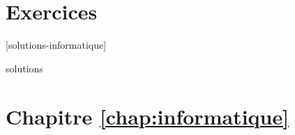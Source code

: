

\section{Exercices}
\label{operateurs:exercices}

[solutions-informatique]

\begin{Filesave}{solutions}
\section*{Chapitre \ref*{chap:informatique}}

\end{Filesave}


